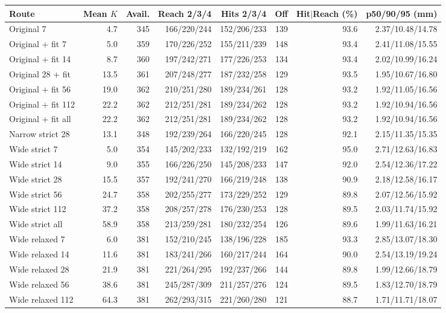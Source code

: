 \begin{tabular}{lrrrrrrr}
\toprule
Route & Mean $K$ & Avail. & Reach 2/3/4 & Hits 2/3/4 & Off & Hit$\mid$Reach (\%) & p50/90/95 (mm) \\
\midrule
Original 7 & 4.7 & 345 & 166/220/244 & 152/206/233 & 139 & 93.6 & 2.37/10.48/14.78 \\
Original + fit 7 & 5.0 & 359 & 170/226/252 & 155/211/239 & 148 & 93.4 & 2.41/11.08/15.55 \\
Original + fit 14 & 8.7 & 360 & 197/242/271 & 177/226/253 & 134 & 93.4 & 2.02/10.99/16.24 \\
Original 28 + fit & 13.5 & 361 & 207/248/277 & 187/232/258 & 129 & 93.5 & 1.95/10.67/16.80 \\
Original + fit 56 & 19.0 & 362 & 210/251/280 & 189/234/261 & 128 & 93.2 & 1.92/11.05/16.56 \\
Original + fit 112 & 22.2 & 362 & 212/251/281 & 189/234/262 & 128 & 93.2 & 1.92/10.94/16.56 \\
Original + fit all & 22.2 & 362 & 212/251/281 & 189/234/262 & 128 & 93.2 & 1.92/10.94/16.56 \\
Narrow strict 28 & 13.1 & 348 & 192/239/264 & 166/220/245 & 128 & 92.1 & 2.15/11.35/15.35 \\
Wide strict 7 & 5.0 & 354 & 145/202/233 & 132/192/219 & 162 & 95.0 & 2.71/12.63/16.83 \\
Wide strict 14 & 9.0 & 355 & 166/226/250 & 145/208/233 & 147 & 92.0 & 2.54/12.36/17.22 \\
Wide strict 28 & 15.5 & 357 & 192/241/270 & 166/219/248 & 138 & 90.9 & 2.18/12.58/16.17 \\
Wide strict 56 & 24.7 & 358 & 202/255/277 & 173/229/252 & 129 & 89.8 & 2.07/12.56/15.92 \\
Wide strict 112 & 37.2 & 358 & 208/257/278 & 176/230/253 & 128 & 89.5 & 2.03/11.74/15.92 \\
Wide strict all & 58.9 & 358 & 213/259/281 & 180/232/254 & 126 & 89.6 & 1.99/11.63/16.21 \\
Wide relaxed 7 & 6.0 & 381 & 152/210/245 & 138/196/228 & 185 & 93.3 & 2.85/13.07/18.30 \\
Wide relaxed 14 & 11.6 & 381 & 183/241/266 & 160/217/244 & 164 & 90.0 & 2.54/13.19/19.24 \\
Wide relaxed 28 & 21.9 & 381 & 221/264/295 & 192/237/266 & 144 & 89.8 & 1.99/12.66/18.79 \\
Wide relaxed 56 & 38.6 & 381 & 245/287/309 & 211/257/276 & 124 & 89.5 & 1.83/12.70/18.79 \\
Wide relaxed 112 & 64.3 & 381 & 262/293/315 & 221/260/280 & 121 & 88.7 & 1.71/11.71/18.07 \\

\end{tabular}
